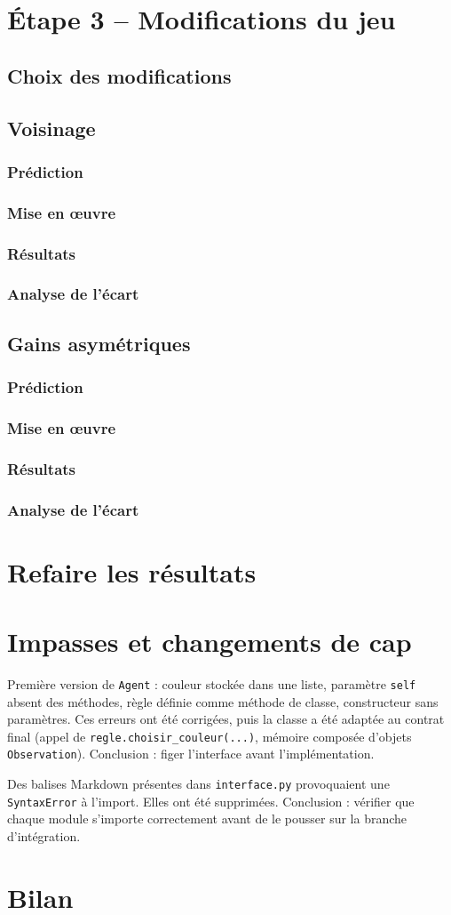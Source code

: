 \documentclass[11pt,a4paper]{article}
\begin{document}
\section{Étape 3 -- Modifications du jeu}
\subsection{Choix des modifications}
\subsection{Voisinage}
\subsubsection{Prédiction}
\subsubsection{Mise en œuvre}
\subsubsection{Résultats}
\subsubsection{Analyse de l'écart}
\subsection{Gains asymétriques}
\subsubsection{Prédiction}
\subsubsection{Mise en œuvre}
\subsubsection{Résultats}
\subsubsection{Analyse de l'écart}

\section{Refaire les résultats}

\section{Impasses et changements de cap}
Première version de \texttt{Agent} : couleur stockée dans une liste, paramètre \texttt{self} absent des méthodes, règle
définie comme méthode de classe, constructeur sans paramètres. Ces erreurs ont été corrigées, puis la classe a été adaptée au
contrat final (appel de \texttt{regle.choisir\_couleur(...)}, mémoire composée d'objets \texttt{Observation}). Conclusion : figer
l'interface avant l'implémentation.

Des balises Markdown présentes dans \texttt{interface.py} provoquaient une \texttt{SyntaxError} à l'import. Elles ont été
supprimées. Conclusion : vérifier que chaque module s'importe correctement avant de le pousser sur la branche d'intégration.

\section{Bilan}
\end{document}
